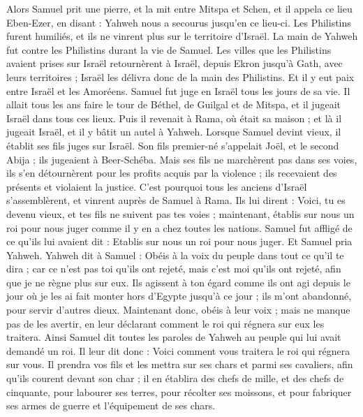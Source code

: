 \begin{multicols}{2}
Alors Samuel prit une pierre, et la mit entre Mitspa et Schen, et il appela ce lieu Eben-Ezer, en disant : Yahweh nous a secourus jusqu'en ce lieu-ci.
Les Philistins furent humiliés, et ils ne vinrent plus sur le territoire d'Israël. La main de Yahweh fut contre les Philistins durant la vie de Samuel.
Les villes que les Philistins avaient prises sur Israël retournèrent à Israël, depuis Ekron jusqu'à Gath, avec leurs territoires ; Israël les délivra donc de la main des Philistins. Et il y eut paix entre Israël et les Amoréens.
Samuel fut juge en Israël tous les jours de sa vie.
Il allait tous les ans faire le tour de Béthel, de Guilgal et de Mitspa, et il jugeait Israël dans tous ces lieux.
Puis il revenait à Rama, où était sa maison ; et là il jugeait Israël, et il y bâtit un autel à Yahweh.
\VerseOne{}Lorsque Samuel devint vieux, il établit ses fils juges sur Israël.
Son fils premier-né s’appelait Joël, et le second Abija ; ils jugeaient à Beer-Schéba.
Mais ses fils ne marchèrent pas dans ses voies, ils s’en détournèrent pour les profits acquis par la violence ; ils recevaient des présents et violaient la justice.
C'est pourquoi tous les anciens d'Israël s'assemblèrent, et vinrent auprès de Samuel à Rama.
Ils lui dirent : Voici, tu es devenu vieux, et tes fils ne suivent pas tes voies ; maintenant, établis sur nous un roi pour nous juger comme il y en a chez toutes les nations.
Samuel fut affligé de ce qu'ils lui avaient dit : Etablis sur nous un roi pour nous juger. Et Samuel pria Yahweh.
Yahweh dit à Samuel : Obéis à la voix du peuple dans tout ce qu'il te dira ; car ce n'est pas toi qu'ils ont rejeté, mais c'est moi qu'ils ont rejeté, afin que je ne règne plus sur eux.
Ils agissent à ton égard comme ils ont agi depuis le jour où je les ai fait monter hors d'Egypte jusqu’à ce jour ; ils m’ont abandonné, pour servir d'autres dieux.
Maintenant donc, obéis à leur voix ; mais ne manque pas de les avertir, en leur déclarant comment le roi qui régnera sur eux les traitera.
Ainsi Samuel dit toutes les paroles de Yahweh au peuple qui lui avait demandé un roi.
Il leur dit donc : Voici comment vous traitera le roi qui régnera sur vous. Il prendra vos fils et les mettra sur ses chars et parmi ses cavaliers, afin qu’ils courent devant son char ;
il en établira des chefs de mille, et des chefs de cinquante, pour labourer ses terres, pour récolter ses moissons, et pour fabriquer ses armes de guerre et l’équipement de ses chars.

\end{multicols}
